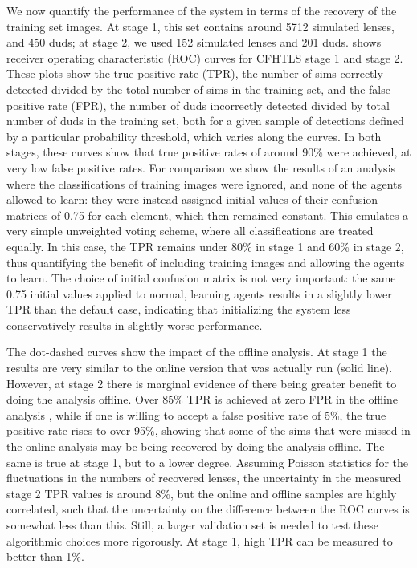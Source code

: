 \documentclass[useAMS,usenatbib,a4paper]{mn2e}
\begin{document}
We now quantify the performance of the \sw system in terms of the recovery of
the training set images. At stage 1, this set contains around 5712 simulated
lenses, and 450 duds; at stage 2, we used 152 simulated lenses and 201 duds.
 shows receiver operating characteristic (ROC)
curves for CFHTLS stage 1 and stage 2. These plots show the true positive rate
(TPR), the number of sims correctly detected divided by the total number of
sims in the training set, and the false positive rate (FPR), the number of
duds incorrectly detected  divided by total number of duds in the training
set, both for a given sample of detections defined by a particular probability
threshold, which varies along the curves.  In both stages, these curves show
that true positive rates of  around 90\% were achieved, at very low false
positive rates. For comparison we show the results of an analysis where the
classifications of  training images were ignored, and none of the agents
allowed to learn: they were instead assigned initial values of their confusion
matrices of 0.75 for each element, which then remained constant. This emulates
a very simple unweighted voting scheme, where all classifications are treated
equally. In this case, the TPR remains under 80\% in stage 1 and 60\% in stage
2, thus quantifying  the benefit of including training images and allowing the
agents to learn. The choice of initial confusion matrix is not very important:
the same 0.75 initial values applied to normal, learning agents results in a
slightly lower TPR than the default case, indicating that initializing the
system less conservatively results in slightly worse performance.

The dot-dashed curves show the impact of the offline analysis. At stage 1 the
results are very similar to the online version that was actually run (solid
line). However, at stage 2 there is marginal evidence of there being greater
benefit to doing the analysis offline. Over 85\% TPR is achieved at zero FPR
in the offline analysis , while if one is willing to accept a false positive
rate of 5\%, the true positive rate rises to over 95\%, showing that some of
the sims that were missed in the online analysis may be being recovered by
doing the analysis offline. The same is true at stage 1, but to a lower
degree. Assuming Poisson statistics for the fluctuations in the numbers of
recovered lenses, the uncertainty in the measured stage 2 TPR values is around
8\%, but the online and offline samples are highly correlated, such that the
uncertainty on the difference between the ROC curves is somewhat less than
this. Still, a larger validation set is needed to test these algorithmic
choices more rigorously. At stage 1, high TPR can be measured to better than
1\%.
\end{document}
